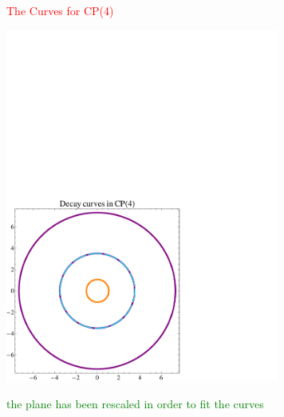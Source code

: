 \documentclass[12pt,letterpaper,landscape,KOMA,smallheadings,calcdimensions,display]{powersem}
\begin{document}
\begin{slide}

\centerline{\textcolor{red}{\Large The Curves for CP(4)}}

\vspace{-4.5cm}
\begin{center}
\hspace{2.5cm}
\includegraphics[width=9.0cm]{ccp4.pdf}
\end{center}

\centerline{\textcolor{green}{\small the plane has been rescaled in order to fit the curves}}

\end{slide}
\end{document}
